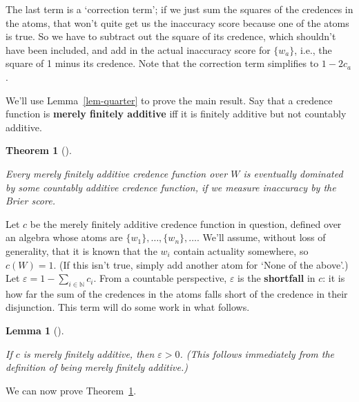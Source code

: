 \documentclass[
  11pt,
  letterpaper,
  DIV=11,
  numbers=noendperiod,
  twoside]{scrartcl}
\theoremstyle{definition}
\theoremstyle{plain}
\newtheorem{lemma}{Lemma}[section]
\theoremstyle{plain}
\newtheorem{theorem}{Theorem}[section]
\theoremstyle{remark}
\begin{document}
The last term is a `correction term'; if we just sum the squares of the
credences in the atoms, that won't quite get us the inaccuracy score
because one of the atoms is true. So we have to subtract out the square
of its credence, which shouldn't have been included, and add in the
actual inaccuracy score for \(\{w_a\}\), i.e., the square of 1 minus its
credence. Note that the correction term simplifies to \(1 - 2c_a\).

We'll use Lemma~\ref{lem-quarter} to prove the main result. Say that a
credence function is \textbf{merely finitely additive} iff it is
finitely additive but not countably additive.

\begin{theorem}[]\protect\hypertarget{thm-main}{}\label{thm-main}

Every merely finitely additive credence function over \(W\) is
eventually dominated by some countably additive credence function, if we
measure inaccuracy by the Brier score.

\end{theorem}

Let \(c\) be the merely finitely additive credence function in question,
defined over an algebra whose atoms are
\(\{w_1\}, \dots, \{w_n\}, \dots\). We'll assume, without loss of
generality, that it is known that the \(w_i\) contain actuality
somewhere, so \(c(W) = 1\). (If this isn't true, simply add another atom
for `None of the above'.) Let
\(\varepsilon = 1 - \sum_{i \in \mathbb{N}}c_i\). From a countable
perspective, \(\varepsilon\) is the \textbf{shortfall} in \(c\): it is
how far the sum of the credences in the atoms falls short of the
credence in their disjunction. This term will do some work in what
follows.

\begin{lemma}[]\protect\hypertarget{lem-shortfall}{}\label{lem-shortfall}

If \(c\) is merely finitely additive, then \(\varepsilon > 0\). (This
follows immediately from the definition of being merely finitely
additive.)

\end{lemma}

We can now prove Theorem~\ref{thm-main}.
\end{document}
